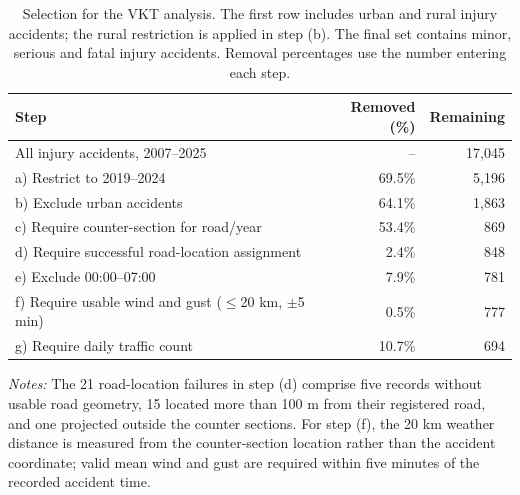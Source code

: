 \begin{table}[H]
\centering
\caption[Selection for the VKT analysis.]{Selection for the VKT analysis. The first row includes urban and rural injury accidents; the rural restriction is applied in step (b). The final set contains minor, serious and fatal injury accidents. Removal percentages use the number entering each step.}
\label{tab:monthly-vkt-selection}
\small
\begin{tabular}{p{}rr}
\toprule
Step & Removed (\%) & Remaining \\ \midrule
All injury accidents, 2007--2025 & -- & 17,045 \\ \grayhline
a) Restrict to 2019--2024 & 69.5\% & 5,196 \\ \grayhline
b) Exclude urban accidents & 64.1\% & 1,863 \\ \grayhline
c) Require counter-section for road/year & 53.4\% & 869 \\ \grayhline
d) Require successful road-location assignment & 2.4\% & 848 \\ \grayhline
e) Exclude 00:00--07:00 & 7.9\% & 781 \\ \grayhline
f) Require usable wind and gust ($\leq$20 km, $\pm$5 min) & 0.5\% & 777 \\ \grayhline
g) Require daily traffic count & 10.7\% & 694 \\
\bottomrule
\end{tabular}

\vspace{0.4em}
\begin{minipage}{0.94\textwidth}
\footnotesize
\textit{Notes:} The 21 road-location failures in step (d) comprise five records
without usable road geometry, 15 located more than 100 m from their registered
road, and one projected outside the counter sections. For step (f), the 20 km
weather distance is measured from the counter-section location rather than the
accident coordinate; valid mean wind and gust are required within five minutes
of the recorded accident time.
\end{minipage}
\end{table}
